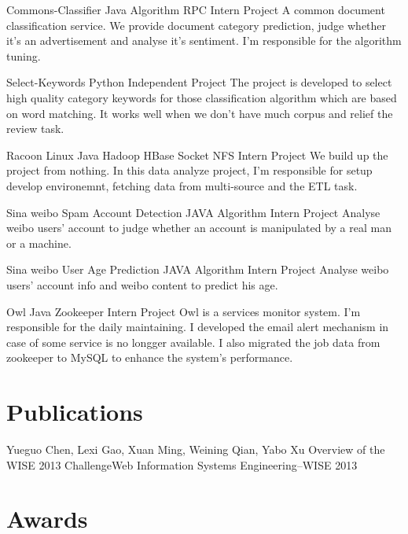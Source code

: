 \documentclass[11pt,a4paper]{moderncv}
\begin{document}
\vspace*{0.2\baselineskip}
{Commons-Classifier}
{Java Algorithm RPC}
{Intern Project}{}
{A common document classification service. We provide document category prediction, judge whether it's an advertisement and analyse it's sentiment. I'm responsible for the algorithm tuning.}

\vspace*{0.2\baselineskip}
{Select-Keywords}
{Python}
{Independent Project}{}
{The project is developed to select high quality category keywords for those classification algorithm which are based on word matching. It works well when we don't have much corpus and relief the review task.}

\vspace*{0.2\baselineskip}
{Racoon}
{Linux Java Hadoop HBase Socket NFS}
{Intern Project}{}
{We build up the project from nothing. In this data analyze project, I'm responsible for setup develop environemnt, fetching data from multi-source and the ETL task.}

\vspace*{0.2\baselineskip}
{Sina weibo Spam Account Detection}
{JAVA Algorithm}
{Intern Project}{}
{Analyse weibo users' account to judge whether an account is manipulated by a real man or a machine.}

\vspace*{0.2\baselineskip}
{Sina weibo User Age Prediction}
{JAVA Algorithm}
{Intern Project}{}
{Analyse weibo users' account info and weibo content to predict his age.}

\vspace*{0.2\baselineskip}
{Owl}
{Java Zookeeper}
{Intern Project}{}
{Owl is a services monitor system. I'm responsible for the daily maintaining. I developed the email alert mechanism in case of some service is no longger available. I also migrated the job data from zookeeper to MySQL to enhance the system's performance.}

\renewcommand{\baselinestretch}{1.0}

\section{Publications}
{\textnormal{Yueguo Chen, Lexi Gao, }Xuan Ming\textnormal{, Weining Qian, Yabo Xu}}
{Overview of the WISE 2013 Challenge}{Web Information Systems Engineering–WISE 2013}
{}{}{}

\section{Awards}
\end{document}
